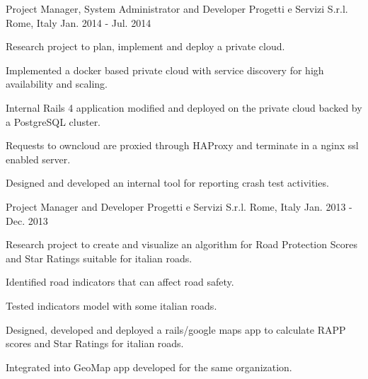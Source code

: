 \begin{cventries}
  \cventry
    {Project Manager, System Administrator and Developer} %
    {Progetti e Servizi S.r.l.} %
    {Rome, Italy} %
    {Jan. 2014 - Jul. 2014} %
    {
      \begin{cvitems} %
        \item {Research project to plan, implement and deploy a private cloud.}
        \item {Implemented a docker based private cloud with service discovery for high availability and scaling.}
        \item {Internal Rails 4 application modified and deployed on the private cloud backed by a PostgreSQL cluster.}
        \item {Requests to owncloud are proxied through HAProxy and terminate in a nginx ssl enabled server.}
        \item {Designed and developed an internal tool for reporting crash test activities.}
          \begin{cvsubentries}
          \end{cvsubentries}
      \end{cvitems}
    }

  \cventry
    {Project Manager and Developer} %
    {Progetti e Servizi S.r.l.} %
    {Rome, Italy} %
    {Jan. 2013 - Dec. 2013} %
    {
      \begin{cvitems} %
        \item {Research project to create and visualize an algorithm for Road Protection Scores and Star Ratings suitable for italian roads.}
        \item {Identified road indicators that can affect road safety.}
        \item {Tested indicators model with some italian roads.}
        \item {Designed, developed and deployed a rails/google maps app to calculate RAPP scores and Star Ratings for italian roads.}
        \item {Integrated into GeoMap app developed for the same organization.}
      \end{cvitems}
    }


\end{cventries}
